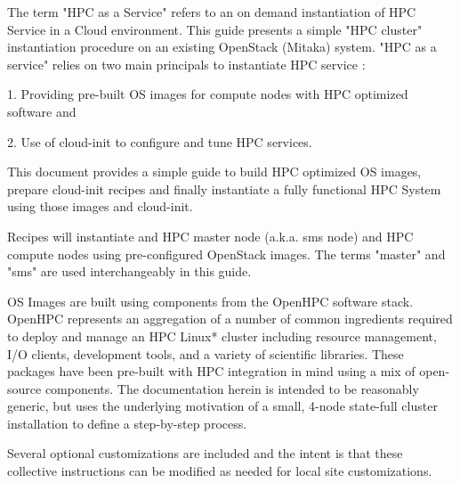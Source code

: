 The term "HPC as a Service" refers to an on demand instantiation of HPC Service in a Cloud environment. This guide presents a simple "HPC cluster" instantiation procedure on an existing OpenStack (Mitaka) system. "HPC as a service" relies on two main principals to instantiate HPC service :


\begin{list}{}
	\item 	1. Providing pre-built OS images for compute nodes with HPC optimized software and 
	\item   2. Use of cloud-init to configure and tune HPC services.
	 
\end{list}
	
This document provides a simple guide to build HPC optimized OS images, prepare cloud-init recipes and finally instantiate a fully functional HPC System using those images and cloud-init. 

Recipes will instantiate and HPC master node (a.k.a. sms node) and HPC compute nodes using pre-configured OpenStack images. The terms "master" and "sms" are used interchangeably in this guide.

OS Images are built using components from the OpenHPC software stack. OpenHPC represents an aggregation of a number of common ingredients required to deploy and manage an HPC Linux* cluster including resource management, I/O clients, development tools, and a variety of scientific libraries. These packages have been pre-built with HPC integration in mind using a mix of open-source components. The documentation herein is intended to be reasonably generic,
but uses the underlying motivation of a small, 4-node state-full cluster installation to define a step-by-step process. 

Several optional customizations are included and the intent is that these collective instructions can be modified as needed for local site customizations.


